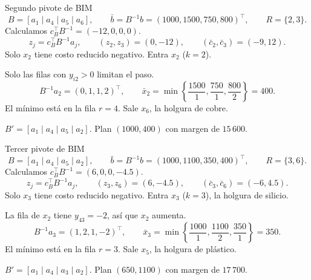 \documentclass[aspectratio=169,12pt]{beamer}
\begin{document}
\begingroup
\let\numeropivoteBIM\insertframenumber
\renewcommand{\insertframenumber}{\numeropivoteBIM a}
\begin{frame}[noframenumbering]{Segundo pivote de BIM}
\[
 B=[a_1\mid a_4\mid a_5\mid a_6],\qquad
 \bar b=B^{-1}b=(1000,1500,750,800)^\top,\qquad R=\{2,3\}.
\]
 Calculamos $c_B^\top B^{-1}=(-12,0,0,0)$.
\[
 z_j=c_B^\top B^{-1}a_j,\qquad (z_2,z_3)=(0,-12),\qquad
 (\bar c_2,\bar c_3)=(-9,12).
\]
Solo $x_2$ tiene costo reducido negativo. Entra $x_2$ ($k=2$).
\medskip

 Solo las filas con $y_{i2}>0$ limitan el paso.
\[
 B^{-1}a_2=(0,1,1,2)^\top,\qquad
 \bar x_2=\min\left\{\frac{1500}{1},\frac{750}{1},\frac{800}{2}\right\}=400.
\]
El mínimo está en la fila $r=4$. Sale $x_6$, la holgura de cobre.
\medskip

 $B'=[a_1\mid a_4\mid a_5\mid a_2]$.
Plan $(1000,400)$ con margen de $15\,600$.
\end{frame}

\renewcommand{\insertframenumber}{\numeropivoteBIM b}
\begin{frame}[noframenumbering]{Tercer pivote de BIM}
\[
 B=[a_1\mid a_4\mid a_5\mid a_2],\qquad
 \bar b=B^{-1}b=(1000,1100,350,400)^\top,\qquad R=\{3,6\}.
\]
 Calculamos $c_B^\top B^{-1}=(6,0,0,-4.5)$.
\[
 z_j=c_B^\top B^{-1}a_j,\qquad (z_3,z_6)=(6,-4.5),\qquad
 (\bar c_3,\bar c_6)=(-6,4.5).
\]
Solo $x_3$ tiene costo reducido negativo. Entra $x_3$ ($k=3$), la holgura de silicio.
\medskip

 La fila de $x_2$ tiene $y_{43}=-2$, así que $x_2$ aumenta.
\[
 B^{-1}a_3=(1,2,1,-2)^\top,\qquad
 \bar x_3=\min\left\{\frac{1000}{1},\frac{1100}{2},\frac{350}{1}\right\}=350.
\]
El mínimo está en la fila $r=3$. Sale $x_5$, la holgura de plástico.
\medskip

 $B'=[a_1\mid a_4\mid a_3\mid a_2]$.
Plan $(650,1100)$ con margen de $17\,700$.
\end{frame}
\endgroup
\end{document}
